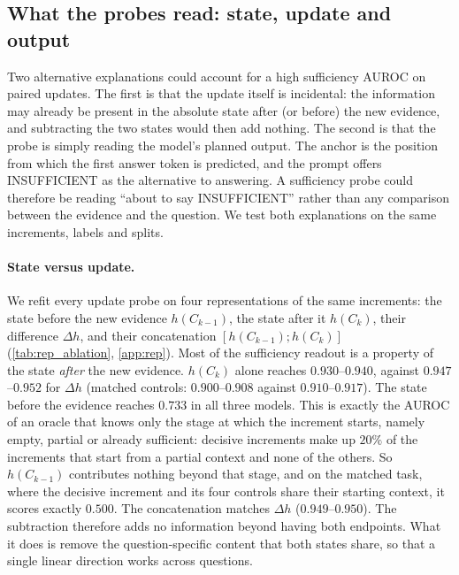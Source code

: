 \subsection{What the probes read: state, update and output}
\label{sec:what}
Two alternative explanations could account for a high sufficiency AUROC on paired updates. The first is that the update itself is incidental: the information may already be present in the absolute state after (or before) the new evidence, and subtracting the two states would then add nothing. The second is that the probe is simply reading the model's planned output. The anchor is the position from which the first answer token is predicted, and the prompt offers INSUFFICIENT as the alternative to answering. A sufficiency probe could therefore be reading ``about to say INSUFFICIENT'' rather than any comparison between the evidence and the question. We test both explanations on the same increments, labels and splits.

\paragraph{State versus update.}
We refit every update probe on four representations of the same increments: the state before the new evidence $h(C_{k-1})$, the state after it $h(C_k)$, their difference $\Delta h$, and their concatenation $[h(C_{k-1});h(C_k)]$ (\cref{tab:rep_ablation}, \cref{app:rep}). Most of the sufficiency readout is a property of the state \emph{after} the new evidence. $h(C_k)$ alone reaches $0.930$--$0.940$, against $0.947$--$0.952$ for $\Delta h$ (matched controls: $0.900$--$0.908$ against $0.910$--$0.917$). The state before the evidence reaches $0.733$ in all three models. This is exactly the AUROC of an oracle that knows only the stage at which the increment starts, namely empty, partial or already sufficient: decisive increments make up $20\%$ of the increments that start from a partial context and none of the others. So $h(C_{k-1})$ contributes nothing beyond that stage, and on the matched task, where the decisive increment and its four controls share their starting context, it scores exactly $0.500$. The concatenation matches $\Delta h$ ($0.949$--$0.950$). The subtraction therefore adds no information beyond having both endpoints. What it does is remove the question-specific content that both states share, so that a single linear direction works across questions.

